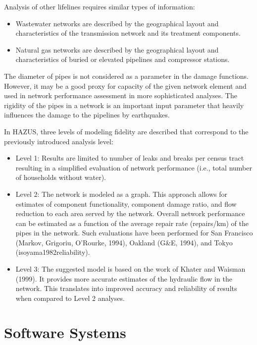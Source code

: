 \noindent Analysis of other lifelines requires similar types of information:

\begin{itemize}
    \item Wastewater networks are described by the geographical layout and characteristics of the transmission network and its treatment components.
    \item Natural gas networks are described by the geographical layout and characteristics of buried or elevated pipelines and compressor stations.
\end{itemize}

The diameter of pipes is not considered as a parameter in the damage functions. However, it may be a good proxy for capacity of the given network element and used in network performance assessment in more sophisticated analyses. The rigidity of the pipes in a network is an important input parameter that heavily influences the damage to the pipelines by earthquakes. 

\noindent In HAZUS, three levels of modeling fidelity are described that correspond to the previously introduced analysis level: 

\begin{itemize}
    \item Level 1: Results are limited to number of leaks and breaks per census tract resulting in a simplified evaluation of network performance (i.e., total number of households without water).
    \item Level 2: The network is modeled as a graph. This approach allows for estimates of component functionality, component damage ratio, and flow reduction to each area served by the network. Overall network performance can be estimated as a function of the average repair rate (repairs/km) of the pipes in the network. Such evaluations have been performed for San Francisco (Markov, Grigoriu, O’Rourke, 1994), Oakland (G\&E, 1994), and Tokyo (isoyama1982reliability).
    \item Level 3: The suggested model is based on the work of Khater and Waisman (1999). It provides more accurate estimates of the hydraulic flow in the network. This translates into improved accuracy and reliability of results when compared to Level 2 analyses.
\end{itemize}

\section{Software Systems}
\label{sec:perf_pipeline_tools}

